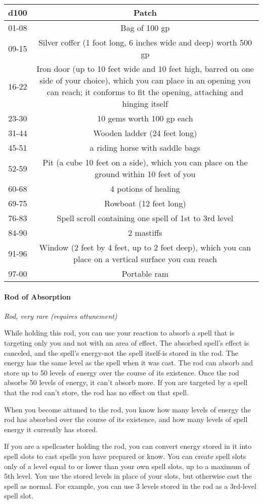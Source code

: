 \documentclass[
]{article}
\begin{document}
\begin{longtable}[]{@{}cc@{}}
\toprule
d100 & Patch\tabularnewline
\midrule
\endhead
01-08 & Bag of 100 gp\tabularnewline
09-15 & Silver coffer (1 foot long, 6 inches wide and deep) worth 500
gp\tabularnewline
16-22 & Iron door (up to 10 feet wide and 10 feet high, barred on one
side of your choice), which you can place in an opening you can reach;
it conforms to fit the opening, attaching and hinging
itself\tabularnewline
23-30 & 10 gems worth 100 gp each\tabularnewline
31-44 & Wooden ladder (24 feet long)\tabularnewline
45-51 & a riding horse with saddle bags\tabularnewline
52-59 & Pit (a cube 10 feet on a side), which you can place on the
ground within 10 feet of you\tabularnewline
60-68 & 4 potions of healing\tabularnewline
69-75 & Rowboat (12 feet long)\tabularnewline
76-83 & Spell scroll containing one spell of 1st to 3rd
level\tabularnewline
84-90 & 2 mastiffs\tabularnewline
91-96 & Window (2 feet by 4 feet, up to 2 feet deep), which you can
place on a vertical surface you can reach\tabularnewline
97-00 & Portable ram\tabularnewline
\bottomrule
\end{longtable}

\hypertarget{rod-of-absorption}{%
\paragraph{Rod of Absorption}\label{rod-of-absorption}}

\emph{Rod, very rare (requires attunement)}

While holding this rod, you can use your reaction to absorb a spell that
is targeting only you and not with an area of effect. The absorbed
spell's effect is canceled, and the spell's energy-not the spell
itself-is stored in the rod. The energy has the same level as the spell
when it was cast. The rod can absorb and store up to 50 levels of energy
over the course of its existence. Once the rod absorbs 50 levels of
energy, it can't absorb more. If you are targeted by a spell that the
rod can't store, the rod has no effect on that spell.

When you become attuned to the rod, you know how many levels of energy
the rod has absorbed over the course of its existence, and how many
levels of spell energy it currently has stored.

If you are a spellcaster holding the rod, you can convert energy stored
in it into spell slots to cast spells you have prepared or know. You can
create spell slots only of a level equal to or lower than your own spell
slots, up to a maximum of 5th level. You use the stored levels in place
of your slots, but otherwise cast the spell as normal. For example, you
can use 3 levels stored in the rod as a 3rd-level spell slot.
\end{document}
